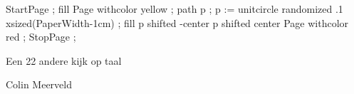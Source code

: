 

   StartPage ;
     fill Page withcolor yellow ;
     path p ; p := unitcircle randomized .1 xsized(PaperWidth-1cm) ;
     fill p shifted -center p shifted center Page  withcolor red ;
   StopPage ;
\stopuseMPgraphic

\setupbackgrounds[page][background=cover]

\startstandardmakeup
  \raggedcenter
  \vfill {}\setstrut \strut Een 22 andere kijk op taal 
  \blank[2*big] \setstrut \strut Colin Meerveld
  \vfill
\stopstandardmakeup


\setupbackgrounds[page][background=]


